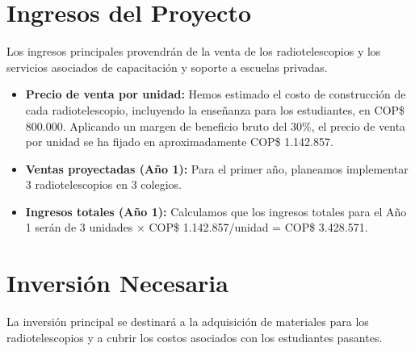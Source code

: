 \section{Ingresos del Proyecto}

Los ingresos principales provendrán de la venta de los radiotelescopios y los
servicios asociados de capacitación y soporte a escuelas privadas.

\begin{itemize}
  \item \textbf{Precio de venta por unidad:} Hemos estimado el costo de
    construcción de cada radiotelescopio, incluyendo la enseñanza para los
    estudiantes, en COP\$ 800.000. Aplicando un margen de beneficio bruto del
    30\%, el precio de venta por unidad se ha fijado en aproximadamente
    COP\$ 1.142.857.
  \item \textbf{Ventas proyectadas (Año 1):} Para el primer año, planeamos
    implementar 3 radiotelescopios en 3 colegios.
  \item \textbf{Ingresos totales (Año 1):} Calculamos que los ingresos
    totales para el Año 1 serán de 3 unidades
    $\times$ COP\$ 1.142.857/unidad = COP\$ 3.428.571.
\end{itemize}

\section{Inversión Necesaria}

La inversión principal se destinará a la adquisición de materiales para los
radiotelescopios y a cubrir los costos asociados con los estudiantes pasantes.


